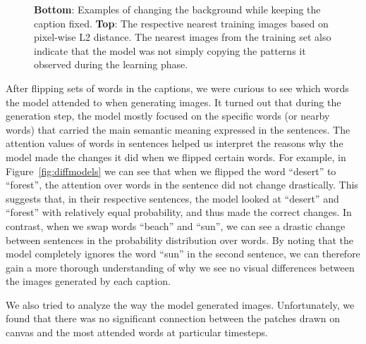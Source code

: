 \documentclass{article} %
\begin{document}
\begin{figure}[!t]
\begin{center}
%
\quad
%
\quad
%
\end{center}
\caption{\textbf{Bottom}: Examples of changing the background while keeping the caption fixed. \textbf{Top}: The respective nearest training images based on pixel-wise L2 distance. The nearest images from the training set also indicate that the model was not simply copying the patterns it observed during the learning phase.}
\label{fig:genimages2}
\end{figure}

After flipping sets of words in the captions, we were curious to see which words the model attended to when generating images. It turned out that during the generation step, the model mostly focused on the specific words (or nearby words) that carried the main semantic meaning expressed in the sentences. The attention values of words in sentences helped us interpret the reasons why the model made the changes it did when we flipped certain words. For example, in Figure~\ref{fig:diffmodels} we can see that when we flipped the word ``desert'' to ``forest'', the attention over words in the sentence did not change drastically. This suggests that, in their respective sentences, the model looked at ``desert'' and ``forest'' with relatively equal probability, and thus made the correct changes. In contrast, when we swap words ``beach'' and ``sun'', we can see a drastic change between sentences in the probability distribution over words. By noting that the model completely ignores the word ``sun'' in the second sentence, we can therefore gain a more thorough understanding of why we see no visual differences between the images generated by each caption.

We also tried to analyze the way the model generated images. Unfortunately, we found that there was no significant connection between the patches drawn on canvas and the most attended words at particular timesteps.
\end{document}
